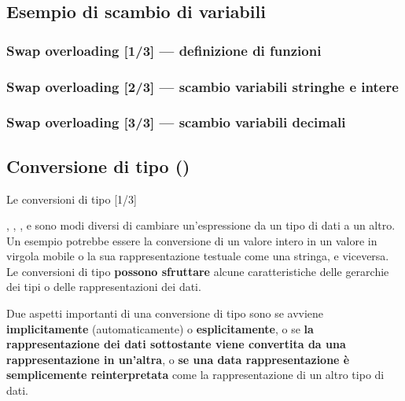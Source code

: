 \documentclass[xcolor={dvipsnames, svgnames, x11names, table}, 10pt]{beamer}
\begin{document}
\subsection*{Esempio di scambio di variabili}

\begin{frame}[t, fragile]

    \frametitle<1>{Swap overloading [1/3] --- \alert{definizione di funzioni}}
    
    \frametitle<2>{Swap overloading [2/3] --- \alert{scambio variabili stringhe e intere}}
    
    \frametitle<3>{Swap overloading [3/3] --- \alert{scambio variabili decimali}}

\end{frame}

\subsection{Conversione di tipo (\texorpdfstring{}{type conversion})}

\begin{frame}[t]{Le conversioni di tipo [1/3]}

\alert<1>{\textbf{}, \textbf{}, \textbf{}, e \textbf{} sono modi diversi di cambiare un'espressione da un tipo di dati a un altro.}
\pause
\alert<2>{Un esempio potrebbe essere la conversione di un valore intero in un valore in virgola mobile o la sua rappresentazione testuale come una stringa, e viceversa.}
\pause
\alert<3>{Le conversioni di tipo \textbf{possono sfruttare} alcune caratteristiche delle gerarchie dei tipi o delle rappresentazioni dei dati.}
\pause

\alert<4>{Due aspetti importanti di una conversione di tipo sono se avviene \textbf{implicitamente} (automaticamente) o \textbf{esplicitamente}}, o \alert<5>{se \textbf{la rappresentazione dei dati sottostante viene convertita da una rappresentazione in un'altra}}, o \alert<6>{\textbf{se una data rappresentazione è semplicemente reinterpretata}} come la rappresentazione di un altro tipo di dati.

\end{frame}
\end{document}
